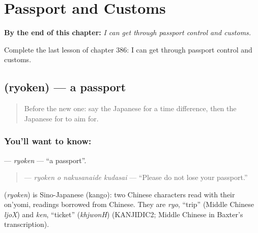 
\chapter{Passport and Customs}
\label{ch:ja-passport-and-customs}

\begin{chapteropening}
\textbf{By the end of this chapter:} \emph{I can get through passport control and customs.}

Complete the last lesson of chapter 386: I can get through passport control and customs.
\end{chapteropening}

\section[\texorpdfstring{\ja{りょけん} (ryoken)}{りょけん (ryoken)}]{ (ryoken) — a passport}

\label{lesson:JA-C386-ryoken}



\begin{quote}
Before the new one: say the Japanese for a time difference, then the Japanese for to aim for.
\end{quote}

\subsection*{You'll want to know: }
\textbf{} — \emph{ryoken} — \textquotedblleft{}a passport\textquotedblright{}.

\begin{quote}
\textbf{  } — \emph{ryoken o nakusanaide kudasai} — \textquotedblleft{}Please do not lose your passport.\textquotedblright{}
\end{quote}

\begin{cousinweb}
\textbf{} (\emph{ryoken}) is Sino-Japanese (kango): two Chinese characters read with their on'yomi, readings borrowed from Chinese. They are \emph{ryo}, \textquotedblleft{}trip\textquotedblright{} (Middle Chinese \emph{ljoX}) and \emph{ken}, \textquotedblleft{}ticket\textquotedblright{} (\emph{khjwonH}) (KANJIDIC2; Middle Chinese in Baxter's transcription).
\end{cousinweb}

